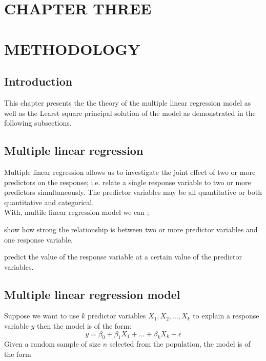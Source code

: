 \documentclass[12pt]{article}
\numberwithin{equation}{section}
\begin{document}
\section*{CHAPTER THREE}
\section*{METHODOLOGY}
\label{sec:methodology}
\setcounter{section}{3}
\setcounter{subsection}{0}

\subsection{Introduction}
This chapter presents the the theory of the multiple linear regression model as well as the Learst square principal solution of the model as demonstrated in the following subsections.
\subsection{Multiple linear regression}
Multiple linear regression allows us to investigate the joint effect of two or more  predictors on the response; i.e. relate a single response variable to two or more  predictors simultaneously. The predictor variables may be all quantitative or both quantitative and categorical.\\
With, multile linear regression model we can  ;

\begin{bracketedromanenum}
	\item show how strong the relationship is between two or more predictor variables and one response variable.
	\item predict the value of the response variable at a certain value of the predictor variables.
\end{bracketedromanenum}

\subsection{Multiple linear regression model}

Suppose we want to use $k$ predictor variables $X_1, X_2, \ldots, X_k$ to explain a response variable $y$ then the model is of the form:
\begin{equation}
y=\beta_0+\beta_1 X_1+\ldots+\beta_k X_k+\epsilon
   \label{eq:methodology_eq1}
\end{equation}
Given a random sample of size $n$ selected from the population, the model is of the form
\end{document}
